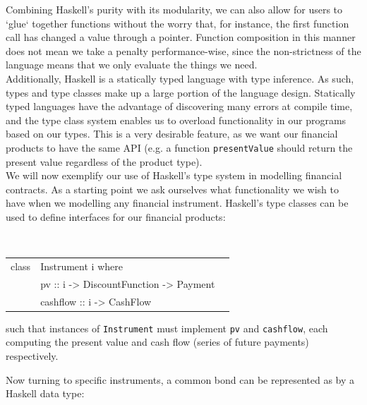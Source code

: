 \documentclass[11pt]{article}
\begin{document}
Combining Haskell's purity with its modularity, we can also allow for users to `glue`
together functions without the worry that, for instance, the first function call has changed
a value through a pointer. Function composition in this manner does not mean we
take a penalty performance-wise, since the non-strictness of the language means that
we only evaluate the things we need.\\

Additionally, Haskell is a statically typed language with type inference. As such, 
types and type classes make up a large portion of the language design. Statically typed languages have the
advantage of discovering many errors at compile time, and the type class system enables us to overload
functionality in our programs based on our types.
This is a very desirable feature, as we want our financial
products to have the same API (e.g. a function \texttt{presentValue} should return the
present value regardless of the product type).\\


We will now exemplify our use of Haskell's type system in modelling financial contracts.
As a starting point we ask ourselves what functionality we wish to have when we modelling
any financial instrument.
Haskell's type classes can be used to define interfaces for our financial products:

\begin{center}
\tt
\begin{tabular}{lll}
class & Instrument i where\\
      &\hspace{-1cm} pv       :: i -> DiscountFunction -> Payment\\
      &\hspace{-1cm} cashflow :: i -> CashFlow\\
\end{tabular}
\end{center}

such that instances of {\tt Instrument} must implement {\tt pv} and {\tt cashflow}, each
computing the present value and cash flow (series of future payments) respectively.

Now turning to specific instruments, a common bond can be represented as by a
Haskell data type:
\end{document}
